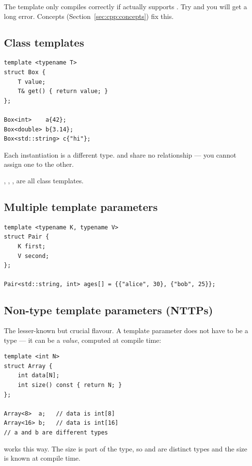 The template only compiles correctly if  actually supports
. Try  and you will get a long
error. Concepts (Section~\ref{sec:cpp:concepts}) fix this.

\subsection{Class templates}

\begin{lstlisting}
template <typename T>
struct Box {
    T value;
    T& get() { return value; }
};

Box<int>    a{42};
Box<double> b{3.14};
Box<std::string> c{"hi"};
\end{lstlisting}

Each instantiation is a different type.  and
 share no relationship --- you cannot assign one
to the other.

, ,
,  are all
class templates.

\subsection{Multiple template parameters}

\begin{lstlisting}
template <typename K, typename V>
struct Pair {
    K first;
    V second;
};

Pair<std::string, int> ages[] = {{"alice", 30}, {"bob", 25}};
\end{lstlisting}

\subsection{Non-type template parameters (NTTPs)}

The lesser-known but crucial flavour. A template parameter does not
have to be a type --- it can be a \emph{value}, computed at compile
time:

\begin{lstlisting}
template <int N>
struct Array {
    int data[N];
    int size() const { return N; }
};

Array<8>  a;   // data is int[8]
Array<16> b;   // data is int[16]
// a and b are different types
\end{lstlisting}

 works this way. The size is part of the
type, so  and  are
distinct types and the size is known at compile time.

